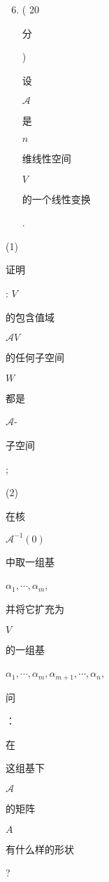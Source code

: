 \documentclass[10pt]{article}
\begin{document}
\begin{enumerate}
  \setcounter{enumi}{5}
  \item ( 20 \begin{CJK}{UTF8}{mj}分\end{CJK}) \begin{CJK}{UTF8}{mj}设\end{CJK} $\mathscr{A}$ \begin{CJK}{UTF8}{mj}是\end{CJK} $n$ \begin{CJK}{UTF8}{mj}维线性空间\end{CJK} $V$ \begin{CJK}{UTF8}{mj}的一个线性变换\end{CJK}.
\end{enumerate}
(1) \begin{CJK}{UTF8}{mj}证明\end{CJK}: $V$ \begin{CJK}{UTF8}{mj}的包含值域\end{CJK} $\mathscr{A} V$ \begin{CJK}{UTF8}{mj}的任何子空间\end{CJK} $W$ \begin{CJK}{UTF8}{mj}都是\end{CJK} $\mathscr{A}$-\begin{CJK}{UTF8}{mj}子空间\end{CJK};

(2) \begin{CJK}{UTF8}{mj}在核\end{CJK} $\mathscr{A}^{-1}(0)$ \begin{CJK}{UTF8}{mj}中取一组基\end{CJK} $\alpha_{1}, \cdots, \alpha_{m}$, \begin{CJK}{UTF8}{mj}并将它扩充为\end{CJK} $V$ \begin{CJK}{UTF8}{mj}的一组基\end{CJK} $\alpha_{1}, \cdots, \alpha_{m}, \alpha_{m+1}, \cdots, \alpha_{n}$, \begin{CJK}{UTF8}{mj}问\end{CJK}：\begin{CJK}{UTF8}{mj}在\end{CJK} \begin{CJK}{UTF8}{mj}这组基下\end{CJK} $\mathscr{A}$ \begin{CJK}{UTF8}{mj}的矩阵\end{CJK} $A$ \begin{CJK}{UTF8}{mj}有什么样的形状\end{CJK}?
\end{document}
